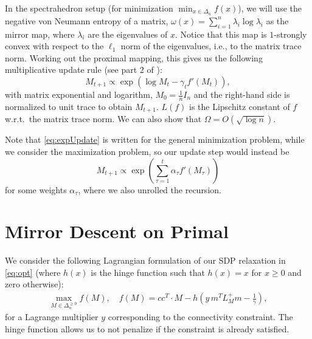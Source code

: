 \documentclass{article}
\begin{document}
In the spectrahedron setup (for minimization $\min_{x \in \Delta_n} f(x)$), we will use the negative von Neumann entropy of a matrix, $\omega(x) = \sum_{i=1}^n \lambda_i \log \lambda_i$ as the mirror map, where $\lambda_i$ are the eigenvalues of $x$. Notice that this map is $1$-strongly convex with respect to the $\ell_1$ norm of the eigenvalues, i.e., to the matrix trace norm. Working out the proximal mapping, this gives us the following multiplicative update rule (see part 2 of \cite{blog}):
\begin{equation}\label{eq:expUpdate}
  M_{t+1} \propto \exp \left( \log M_t - \gamma_t f'(M_t) \right),
\end{equation}
with matrix exponential and logarithm, $M_0 = \frac{1}{n} I_n$ and the right-hand side is normalized to unit trace to obtain $M_{t+1}$. $L(f)$ is the Lipschitz constant of $f$ w.r.t.\ the matrix trace norm. We can also show that $\Omega = O(\sqrt{\log n})$.

Note that \eqref{eq:expUpdate} is written for the general minimization problem, while we consider the maximization problem, so our update step would instead be
\[ M_{t+1} \propto \exp \left( \sum_{\tau=1}^t \alpha_\tau f'(M_\tau) \right) \]
for some weights $\alpha_\tau$, where we also unrolled the recursion.


\section{Mirror Descent on Primal}


We consider the following Lagrangian formulation of our SDP relaxation in \eqref{eq:opt} (where $h(x)$ is the hinge function such that $h(x) = x$ for $x \geq 0$ and zero otherwise):
\begin{align}\label{eq:opt2}
  \max_{M \in \Delta^{\geq 0}_n} f(M), \quad f(M) = cc^T \cdot M - h\left(y \, m^T L_M^+ m - \frac{1}{\gamma} \right),
\end{align}
for a Lagrange multiplier $y$ corresponding to the connectivity constraint.
The hinge function allows us to not penalize if the constraint is already satisfied.
\end{document}
